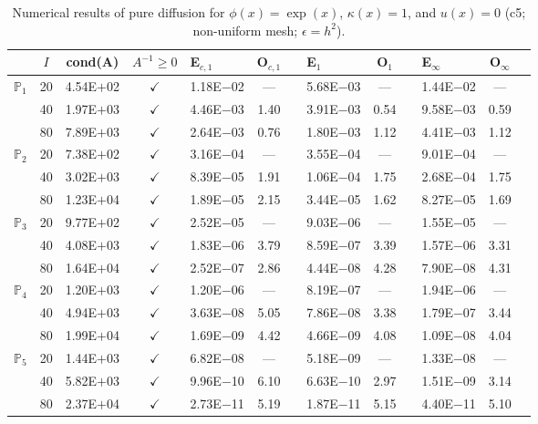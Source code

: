 \begin{table}[H]
\centering
\caption{Numerical results of pure diffusion for $\phi(x)=\exp(x)$, $\kappa(x)=1$, and $u(x)=0$ (c5; non-uniform mesh; $\epsilon=h^2$).}
\begin{tabular}{@{}l c c c l c c l c c l c c@{}}
\toprule
 & $I$ & cond(A) & $A^{-1}\geq 0$ &  E$_{c,1}$ & O$_{c,1}$ && E$_1$ & O$_1$ && E$_{\infty}$ & O$_{\infty}$\\
\midrule
\multirow{3}{*}{$\mathbb{P}_{1}$}
 & 20 & 4.54E$+$02 & $\checkmark$ & 1.18E$-$02 & --- && 5.68E$-$03 & --- && 1.44E$-$02 & ---\\
 & 40 & 1.97E$+$03 & $\checkmark$ & 4.46E$-$03 & 1.40 && 3.91E$-$03 & 0.54 && 9.58E$-$03 & 0.59\\
 & 80 & 7.89E$+$03 & $\checkmark$ & 2.64E$-$03 & 0.76 && 1.80E$-$03 & 1.12 && 4.41E$-$03 & 1.12\\
\midrule
\multirow{3}{*}{$\mathbb{P}_{2}$}
 & 20 & 7.38E$+$02 & $\checkmark$ & 3.16E$-$04 & --- && 3.55E$-$04 & --- && 9.01E$-$04 & ---\\
 & 40 & 3.02E$+$03 & $\checkmark$ & 8.39E$-$05 & 1.91 && 1.06E$-$04 & 1.75 && 2.68E$-$04 & 1.75\\
 & 80 & 1.23E$+$04 & $\checkmark$ & 1.89E$-$05 & 2.15 && 3.44E$-$05 & 1.62 && 8.27E$-$05 & 1.69\\
\midrule
\multirow{3}{*}{$\mathbb{P}_{3}$}
 & 20 & 9.77E$+$02 & $\checkmark$ & 2.52E$-$05 & --- && 9.03E$-$06 & --- && 1.55E$-$05 & ---\\
 & 40 & 4.08E$+$03 & $\checkmark$ & 1.83E$-$06 & 3.79 && 8.59E$-$07 & 3.39 && 1.57E$-$06 & 3.31\\
 & 80 & 1.64E$+$04 & $\checkmark$ & 2.52E$-$07 & 2.86 && 4.44E$-$08 & 4.28 && 7.90E$-$08 & 4.31\\
\midrule
\multirow{3}{*}{$\mathbb{P}_{4}$}
 & 20 & 1.20E$+$03 & $\checkmark$ & 1.20E$-$06 & --- && 8.19E$-$07 & --- && 1.94E$-$06 & ---\\
 & 40 & 4.94E$+$03 & $\checkmark$ & 3.63E$-$08 & 5.05 && 7.86E$-$08 & 3.38 && 1.79E$-$07 & 3.44\\
 & 80 & 1.99E$+$04 & $\checkmark$ & 1.69E$-$09 & 4.42 && 4.66E$-$09 & 4.08 && 1.09E$-$08 & 4.04\\
\midrule
\multirow{3}{*}{$\mathbb{P}_{5}$}
 & 20 & 1.44E$+$03 & $\checkmark$ & 6.82E$-$08 & --- && 5.18E$-$09 & --- && 1.33E$-$08 & ---\\
 & 40 & 5.82E$+$03 & $\checkmark$ & 9.96E$-$10 & 6.10 && 6.63E$-$10 & 2.97 && 1.51E$-$09 & 3.14\\
 & 80 & 2.37E$+$04 & $\checkmark$ & 2.73E$-$11 & 5.19 && 1.87E$-$11 & 5.15 && 4.40E$-$11 & 5.10\\
\bottomrule
\end{tabular}
\end{table}